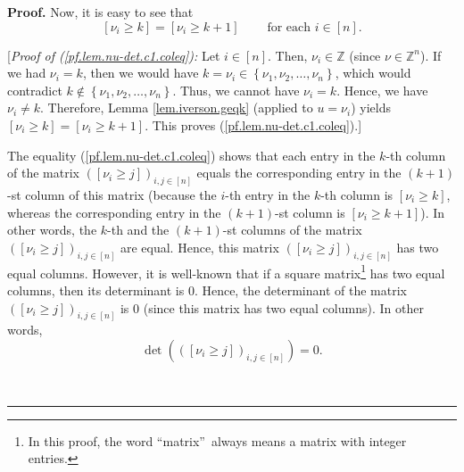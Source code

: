 \documentclass
[numbers=enddot,12pt,final,onecolumn,notitlepage,english]{scrartcl}%
\theoremstyle{definition}
\newenvironment{proof}[1][Proof]{\noindent\textbf{#1.} }{\ \rule{0.5em}{0.5em}}
\newenvironment{verlong}{}{}
\begin{document}
\begin{proof}
\begin{verlong}
Now, it is easy to see that
\begin{equation}
\left[  \nu_{i}\geq k\right]  =\left[  \nu_{i}\geq k+1\right]
\ \ \ \ \ \ \ \ \ \ \text{for each }i\in\left[  n\right]  .
\label{pf.lem.nu-det.c1.coleq}%
\end{equation}


[\textit{Proof of (\ref{pf.lem.nu-det.c1.coleq}):} Let $i\in\left[  n\right]
$. Then, $\nu_{i}\in\mathbb{Z}$ (since $\nu\in\mathbb{Z}^{n}$). If we had
$\nu_{i}=k$, then we would have $k=\nu_{i}\in\left\{  \nu_{1},\nu_{2}%
,\ldots,\nu_{n}\right\}  $, which would contradict $k\notin\left\{  \nu
_{1},\nu_{2},\ldots,\nu_{n}\right\}  $. Thus, we cannot have $\nu_{i}=k$.
Hence, we have $\nu_{i}\neq k$. Therefore, Lemma \ref{lem.iverson.geqk}
(applied to $u=\nu_{i}$) yields $\left[  \nu_{i}\geq k\right]  =\left[
\nu_{i}\geq k+1\right]  $. This proves (\ref{pf.lem.nu-det.c1.coleq}).]
\medskip

The equality (\ref{pf.lem.nu-det.c1.coleq}) shows that each entry in the
$k$-th column of the matrix $\left(  \left[  \nu_{i}\geq j\right]  \right)
_{i,j\in\left[  n\right]  }$ equals the corresponding entry in the $\left(
k+1\right)  $-st column of this matrix (because the $i$-th entry in the $k$-th
column is $\left[  \nu_{i}\geq k\right]  $, whereas the corresponding entry in
the $\left(  k+1\right)  $-st column is $\left[  \nu_{i}\geq k+1\right]  $).
In other words, the $k$-th and the $\left(  k+1\right)  $-st columns of the
matrix $\left(  \left[  \nu_{i}\geq j\right]  \right)  _{i,j\in\left[
n\right]  }$ are equal. Hence, this matrix $\left(  \left[  \nu_{i}\geq
j\right]  \right)  _{i,j\in\left[  n\right]  }$ has two equal columns.
However, it is well-known that if a square matrix\footnote{In this proof, the
word \textquotedblleft matrix\textquotedblright\ always means a matrix with
integer entries.} has two equal columns, then its determinant is $0$. Hence,
the determinant of the matrix $\left(  \left[  \nu_{i}\geq j\right]  \right)
_{i,j\in\left[  n\right]  }$ is $0$ (since this matrix has two equal columns).
In other words,
\begin{equation}
\det\left(  \left(  \left[  \nu_{i}\geq j\right]  \right)  _{i,j\in\left[
n\right]  }\right)  =0. \label{pf.lem.nu-det.c1.det=0}%
\end{equation}



\end{verlong}
\end{proof}
\end{document}
